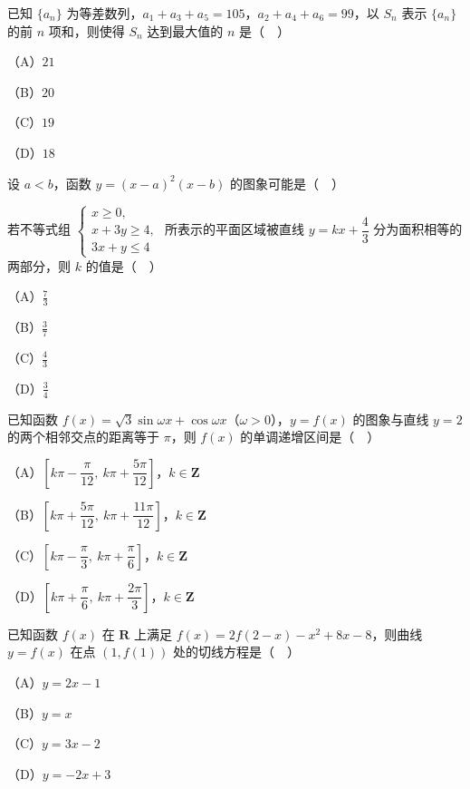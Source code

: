 \begin{question}
已知 $\{a_n\}$ 为等差数列，$a_1+a_3+a_5=105$，$a_2+a_4+a_6=99$，以 $S_n$ 表示 $\{a_n\}$ 的前 $n$ 项和，则使得 $S_n$ 达到最大值的 $n$ 是（　）

（A）$21$

（B）$20$

（C）$19$

（D）$18$

\Needspace{0.4\textheight}
\end{question}
\begin{question}
设 $a<b$，函数 $y=(x-a)^2(x-b)$ 的图象可能是（　）
\nopagebreak[4]
\begin{center}\end{center}
\nopagebreak[4]
\end{question}
\begin{question}
若不等式组 $\begin{cases}x\geqslant0,\\ x+3y\geqslant4,\\ 3x+y\leqslant4\end{cases}$ 所表示的平面区域被直线 $y=kx+\dfrac43$ 分为面积相等的两部分，则 $k$ 的值是（　）

（A）$\frac73$

（B）$\frac37$

（C）$\frac43$

（D）$\frac34$

\end{question}
\begin{question}
已知函数 $f(x)=\sqrt3\sin\omega x+\cos\omega x$（$\omega>0$），$y=f(x)$ 的图象与直线 $y=2$ 的两个相邻交点的距离等于 $\pi$，则 $f(x)$ 的单调递增区间是（　）

（A）$\left[k\pi-\dfrac{\pi}{12},\ k\pi+\dfrac{5\pi}{12}\right]$，$k\in\mathbf Z$

（B）$\left[k\pi+\dfrac{5\pi}{12},\ k\pi+\dfrac{11\pi}{12}\right]$，$k\in\mathbf Z$

（C）$\left[k\pi-\dfrac{\pi}{3},\ k\pi+\dfrac{\pi}{6}\right]$，$k\in\mathbf Z$

（D）$\left[k\pi+\dfrac{\pi}{6},\ k\pi+\dfrac{2\pi}{3}\right]$，$k\in\mathbf Z$

\end{question}
\begin{question}
已知函数 $f(x)$ 在 $\mathbf R$ 上满足 $f(x)=2f(2-x)-x^2+8x-8$，则曲线 $y=f(x)$ 在点 $(1,f(1))$ 处的切线方程是（　）

（A）$y=2x-1$

（B）$y=x$

（C）$y=3x-2$

（D）$y=-2x+3$

\end{question}
